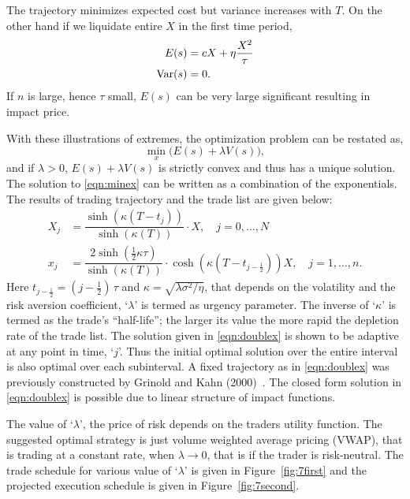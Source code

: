 The trajectory minimizes expected cost but variance increases with $T$. On the other hand if we liquidate entire $X$ in the first time period,
	\begin{equation}\label{eqn:anotherdoubleex}
	\begin{split}
	E(s)&= c X + \eta \frac{X^2}{\tau} \\
	\var(s)&= 0.
	\end{split}
	\end{equation}
If $n$ is large, hence $\tau$ small, $E(s)$ can be very large significant resulting in impact price.


 With these illustrations of extremes, the optimization problem can be restated as,
	\begin{equation}\label{eqn:minex}
	\min_x\big( E(s) + \lambda V(s) \big),
	\end{equation}
and if $\lambda>0$, $E(s)+\lambda V(s)$ is strictly convex and thus has a unique solution. The solution to \eqref{eqn:minex} can be written as a combination of the exponentials. The results of trading trajectory and the trade list are given below:
	\begin{equation}\label{eqn:doublex}
	\begin{split}
	X_j &= \dfrac{\sinh (\kappa(T-t_j))}{\sinh (\kappa(T))}\cdot X, \quad j=0,\ldots,N \\
	x_j &= \dfrac{2 \sinh (\frac{1}{2}\kappa\tau)}{\sinh (\kappa(T))}\cdot \cosh(\kappa(T-t_{j-\frac{1}{2}}))X, \quad j=1,\ldots, n.
	\end{split}
	\end{equation}
Here $t_{j - \frac{1}{2}} = (j - \frac{1}{2})\, \tau$ and $\kappa = \sqrt{\lambda \sigma^2 / \eta}$, that depends on the volatility and the risk aversion coefficient, `$\lambda$' is termed as urgency parameter. The inverse of `$\kappa$' is termed as the trade's ``half-life''; the larger its value the more rapid the depletion rate of the trade list. The solution given in \eqref{eqn:doublex} is shown to be adaptive at any point in time, `$j$'. Thus the initial optimal solution over the entire interval is also optimal over each subinterval. A fixed trajectory as in \eqref{eqn:doublex} was previously constructed by Grinold and Kahn (2000)~\cite{grin2000}. The closed form solution in \eqref{eqn:doublex} is possible due to linear structure of impact functions. 


The value of `$\lambda$', the price of risk depends on the traders utility function. The suggested optimal strategy is just volume weighted average pricing (VWAP), that is trading at a constant rate, when $\lambda \to 0$, that is if the trader is risk-neutral. The trade schedule for various value of `$\lambda$' is given in Figure~\ref{fig:7first} and the projected execution schedule is given in Figure~\ref{fig:7second}. 


